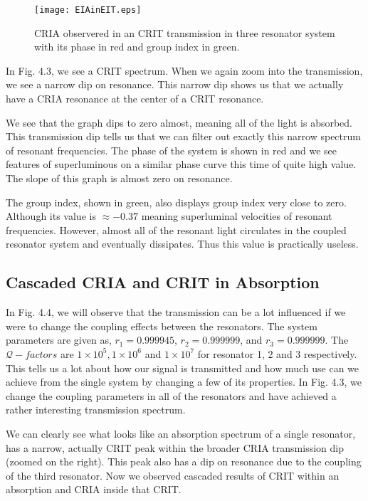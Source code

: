 \begin{figure}[t]
\centering
\texttt{[image: EIAinEIT.eps]}
\caption{CRIA observered in an CRIT transmission in three resonator system with its phase in red and group index in green.}
\end{figure}

In Fig. 4.3, we see a CRIT spectrum. When we again zoom into the transmission, we see a narrow dip on resonance. This narrow dip shows us that we actually have a CRIA resonance at the center of a CRIT resonance.

We see that the graph dips to zero almost, meaning all of the light is absorbed. This transmission dip tells us that we can filter out exactly this narrow spectrum of resonant frequencies. 
The phase of the system is shown in red and we see features of superluminous on a similar phase curve this time of quite high value. The slope of this graph is almost zero on resonance.

The group index, shown in green, also displays group index very close to zero. Although its value is $\approx -0.37$ meaning superluminal velocities of resonant frequencies. However, almost all of the resonant light circulates in the coupled resonator system and eventually dissipates. Thus this value is practically useless.


\subsection{Cascaded CRIA and CRIT in Absorption}
In Fig. 4.4, we will observe that the transmission can be a lot influenced if we were to change the coupling effects between the resonators. The system parameters are given as, $r_{1} = 0.999945$, $r_{2} = 0.999999$, and $r_{3} = 0.999999$. The $\mathcal{Q}-factors$ are $1\times10^{5}, 1\times10^{6}$ and $1\times10^{7}$ for resonator 1, 2 and 3 respectively. This tells us a lot about how our signal is transmitted and how much use can we achieve from the single system by changing a few of its properties. In Fig. 4.3, we change the coupling parameters in all of the resonators and have achieved a rather interesting transmission spectrum.

We can clearly see what looks like an absorption spectrum of a single resonator, has a narrow, actually CRIT peak within the broader CRIA transmission dip (zoomed on the right). This peak also has a dip on resonance due to the coupling of the third resonator. Now we observed cascaded results of CRIT within an absorption and CRIA inside that CRIT. 

